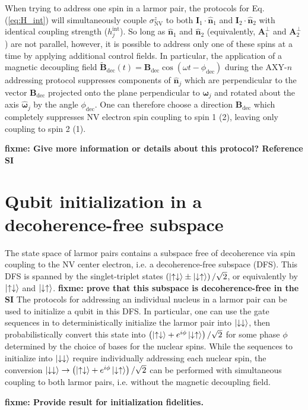 \documentclass[twocolumn]{revtex4-1}
\renewcommand{\t}{\text} %
\newcommand{\p}[1]{\left(#1\right)} %
\renewcommand{\v}{\bm} %
\newcommand{\uv}[1]{\hat{\v{#1}}} %
\renewcommand{\c}{\cdot} %
\renewcommand{\u}{\uparrow}
\renewcommand{\d}{\downarrow}
\newcommand{\NV}{\t{NV}}
\newcommand{\fixme}[1]{{\bf \color{red} fixme: #1}}
\begin{document}
When trying to address one spin in a larmor pair, the protocols for
Eq. (\ref{eq:H_int}) will simultaneously couple $\sigma_\NV^z$ to both
$\v I_1\c\uv n_1$ and $\v I_2\c\uv n_2$ with identical coupling
strength ($h_j^{\t{int}}$). So long as $\uv n_1$ and $\uv n_2$
(equivalently, $\v A_1^\perp$ and $\v A_2^\perp$) are not parallel,
however, it is possible to address only one of these spins at a time
by applying additional control fields. In particular, the application
of a magnetic decoupling field
$\tilde{\v B}_{\t{dec}}\p{t}=\v B_{\t{dec}}\cos\p{\omega
  t-\phi_{\t{dec}}}$ during the AXY-$n$ addressing protocol suppresses
components of $\uv n_j$ which are perpendicular to the vector
$\v B_{\t{dec}}$ projected onto the plane perpendicular to
$\v\omega_j$ and rotated about the axis $\uv\omega_j$ by the angle
$\phi_{\t{dec}}$. One can therefore choose a direction
$\v B_{\t{dec}}$ which completely suppresses NV electron spin coupling
to spin 1 (2), leaving only coupling to spin 2 (1).

\fixme{Give more information or details about this protocol? Reference
  SI}


\section{Qubit initialization in a decoherence-free subspace}

The state space of larmor pairs contains a subspace free of
decoherence via spin coupling to the NV center electron, i.e. a
decoherence-free subspace (DFS). This DFS is spanned by the
singlet-triplet states $\p{\ket{\u\d}\pm\ket{\d\u}}/\sqrt2$, or
equivalently by $\ket{\u\d}$ and $\ket{\d\u}$. \fixme{prove that this
  subspace is decoherence-free in the SI} The protocols for addressing
an individual nucleus in a larmor pair can be used to initialize a
qubit in this DFS. In particular, one can use the gate sequences in
\cite{reiserer2016robust} to deterministically initialize the larmor
pair into $\ket{\d\d}$, then probabilistically convert this state into
$\p{\ket{\u\d}+e^{i\phi}\ket{\d\u}}/\sqrt2$ for some phase $\phi$
determined by the choice of bases for the nuclear spins. While the
sequences to initialize into $\ket{\d\d}$ require individually
addressing each nuclear spin, the conversion
$\ket{\d\d}\to\p{\ket{\u\d}+e^{i\phi}\ket{\d\u}}/\sqrt2$ can be
performed with simultaneous coupling to both larmor pairs,
i.e. without the magnetic decoupling field.

\fixme{Provide result for initialization fidelities.}
\end{document}
